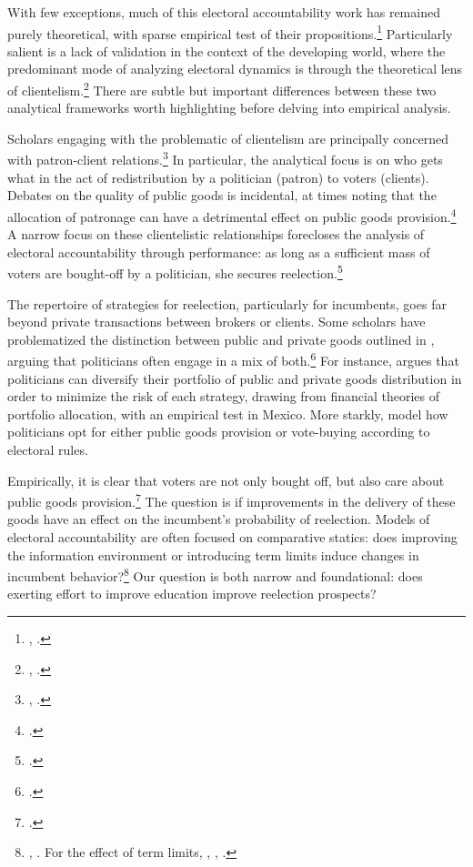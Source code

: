 \documentclass[12pt,]{book}
\let\rmarkdownfootnote\footnote%
\def\footnote{\protect\rmarkdownfootnote}
\begin{document}
With few exceptions, much of this electoral accountability work has remained purely theoretical, with sparse empirical test of their propositions.\footnote{\citet{besley_incumbent_1992}, \citet{ferraz_electoral_2011}.} Particularly salient is a lack of validation in the context of the developing world, where the predominant mode of analyzing electoral dynamics is through the theoretical lens of clientelism.\footnote{\citet{wantchekon_clientelism_2003}, \citet{stokes_brokers_2013}.} There are subtle but important differences between these two analytical frameworks worth highlighting before delving into empirical analysis.

Scholars engaging with the problematic of clientelism are principally concerned with patron-client relations.\footnote{\citet{scott_patron-client_1972}, \citet{hicken_clientelism_2011}.} In particular, the analytical focus is on who gets what in the act of redistribution by a politician (patron) to voters (clients). Debates on the quality of public goods is incidental, at times noting that the allocation of patronage can have a detrimental effect on public goods provision.\footnote{\citet{robinson_political_2013}.} A narrow focus on these clientelistic relationships forecloses the analysis of electoral accountability through performance: as long as a sufficient mass of voters are bought-off by a politician, she secures reelection.\footnote{\citet{dixit_determinants_1996}.}

The repertoire of strategies for reelection, particularly for incumbents, goes far beyond private transactions between brokers or clients. Some scholars have problematized the distinction between public and private goods outlined in \citet{stokes_brokers_2013}, arguing that politicians often engage in a mix of both.\footnote{\citet{min_power_2015}.} For instance, \citet{magaloni_clientelism_2007} argues that politicians can diversify their portfolio of public and private goods distribution in order to minimize the risk of each strategy, drawing from financial theories of portfolio allocation, with an empirical test in Mexico. More starkly, \citet{lizzeri_provision_2001} model how politicians opt for either public goods provision or vote-buying according to electoral rules.

Empirically, it is clear that voters are not only bought off, but also care about public goods provision.\footnote{\citet{kaufman_globalization_2001}.} The question is if improvements in the delivery of these goods have an effect on the incumbent's probability of reelection. Models of electoral accountability are often focused on comparative statics: does improving the information environment or introducing term limits induce changes in incumbent behavior?\footnote{\citet{ashworth_electoral_2012}, \citet{snyder_press_2010}. For the effect of term limits, \citet{ferraz_electoral_2011}, \citet{besley_does_1995}, \citet{besley_political_2003}.} Our question is both narrow and foundational: does exerting effort to improve education improve reelection prospects?
\end{document}
